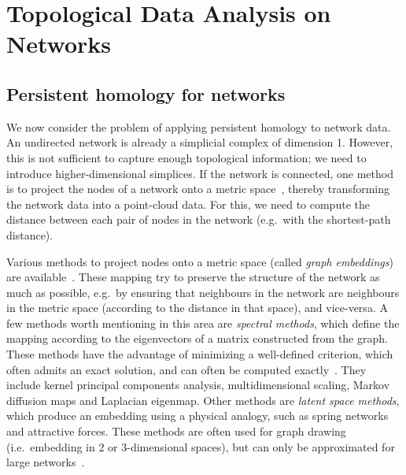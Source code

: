 \documentclass[a4paper,11pt,openany,extrafontsizes]{memoir}
\begin{document}



\chapter{Topological Data Analysis on Networks}%
\label{cha:topol-data-analys}

\section{Persistent homology for networks}%
\label{sec:pers-homol-netw}

We now consider the problem of applying persistent homology to network
data. An undirected network is already a simplicial complex of
dimension 1. However, this is not sufficient to capture enough
topological information; we need to introduce higher-dimensional
simplices. If the network is connected, one method is to project the
nodes of a network onto a metric space~\cite{otter_roadmap_2017},
thereby transforming the network data into a point-cloud data. For
this, we need to compute the distance between each pair of nodes in
the network (e.g.\ with the shortest-path distance).

Various methods to project nodes onto a metric space (called
\emph{graph embeddings}) are
available~\cite{fouss_algorithms_2016}. These mapping try to preserve
the structure of the network as much as possible, e.g.\ by ensuring
that neighbours in the network are neighbours in the metric space
(according to the distance in that space), and vice-versa. A few
methods worth mentioning in this area are \emph{spectral methods},
which define the mapping according to the eigenvectors of a matrix
constructed from the graph. These methods have the advantage of
minimizing a well-defined criterion, which often admits an exact
solution, and can often be computed
exactly~\cite{fouss_algorithms_2016}. They include kernel principal
components analysis, multidimensional scaling, Markov diffusion maps
and Laplacian eigenmap. Other methods are \emph{latent space methods},
which produce an embedding using a physical analogy, such as spring
networks and attractive forces. These methods are often used for graph
drawing (i.e.\ embedding in 2 or 3-dimensional spaces), but can only
be approximated for large networks~\cite{fouss_algorithms_2016}.
\end{document}
